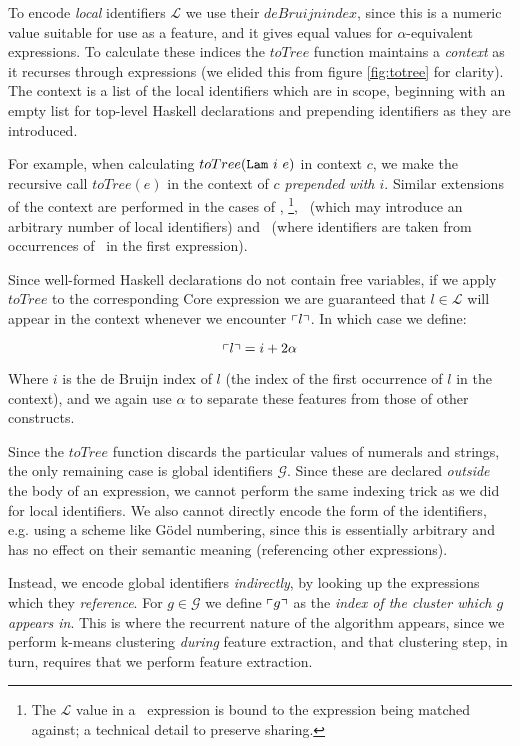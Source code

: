 To encode \emph{local} identifiers $\mathcal{L}$ we use their $de Bruijn index$, since this is a numeric value suitable for use as a feature, and it gives equal values for $\alpha$-equivalent expressions. To calculate these indices the $toTree$ function maintains a \emph{context} as it recurses through expressions (we elided this from figure \ref{fig:totree} for clarity). The context is a list of the local identifiers which are in scope, beginning with an empty list for top-level Haskell declarations and prepending identifiers as they are introduced.

For example, when calculating $toTree(\texttt{Lam}\ i\ e)$ in context $c$, we make the recursive call $toTree(e)$ in the context of \emph{$c$ prepended with $i$}. Similar extensions of the context are performed in the cases of \CBind, \CCase\footnote{The $\mathcal{L}$ value in a \CCase\ expression is bound to the expression being matched against; a technical detail to preserve sharing.}, \CAlt\ (which may introduce an arbitrary number of local identifiers) and \CLet\ (where identifiers are taken from occurrences of \CBind\ in the first expression).

Since well-formed Haskell declarations do not contain free variables, if we apply $toTree$ to the corresponding Core expression we are guaranteed that $l \in \mathcal{L}$ will appear in the context whenever we encounter $\left\ulcorner l \right\urcorner$. \iffalse NOTE: Can we prove this, or would it just be an exercise in formalising Haskell? \fi In which case we define:

$$\left\ulcorner l \right\urcorner = i + 2 \alpha$$

Where $i$ is the de Bruijn index of $l$ (the index of the first occurrence of $l$ in the context), and we again use $\alpha$ to separate these features from those of other constructs.

Since the $toTree$ function discards the particular values of numerals and strings, the only remaining case is global identifiers $\mathcal{G}$. Since these are declared \emph{outside} the body of an expression, we cannot perform the same indexing trick as we did for local identifiers. We also cannot directly encode the form of the identifiers, e.g. using a scheme like G{\"o}del numbering, since this is essentially arbitrary and has no effect on their semantic meaning (referencing other expressions).

Instead, we encode global identifiers \emph{indirectly}, by looking up the expressions which they \emph{reference}. For $g \in \mathcal{G}$ we define $\left\ulcorner g \right\urcorner$ as the \emph{index of the cluster which $g$ appears in}. This is where the recurrent nature of the algorithm appears, since we perform k-means clustering \emph{during} feature extraction, and that clustering step, in turn, requires that we perform feature extraction.

